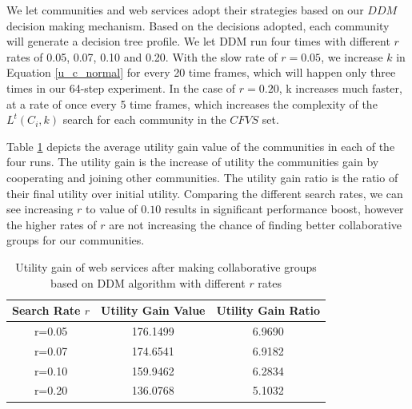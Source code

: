 \documentclass[10pt,journal,cspaper,compsoc]{IEEEtran}
\begin{document}
We let communities and web services adopt their strategies based on our $DDM$ decision making mechanism. Based on the decisions adopted, each community will generate a decision tree profile. We let DDM run four times with different $r$ rates of 0.05, 0.07, 0.10 and 0.20. With the slow rate of $r = 0.05$, we increase $k$ in Equation \ref{u_c_normal} for every 20 time frames, which will happen only three times in our 64-step experiment. In the case of $r = 0.20$, k increases much faster, at a rate of once every 5 time frames, which increases the complexity of the $L^t(C_i,k)$ search for each community in the $CFVS$ set. 

Table \ref{table:valueandgain} depicts the average utility gain value of the communities in each of the four runs. The utility gain is the increase of utility the communities gain by cooperating and joining other communities. The utility gain ratio is the ratio of their final utility over initial utility. Comparing the different search rates, we can see increasing $r$ to value of $0.10$ results in significant performance boost, however the higher rates of $r$ are not increasing the chance of finding better collaborative groups for our communities. 

\begin{table}[ht]
\caption{Utility gain of web services after making collaborative groups based on DDM algorithm with different $r$ rates} %
\centering %
{\renewcommand{\arraystretch}{1.2}
\begin{tabular}{c|c|c} %
\hline\hline %
Search Rate $r$ & Utility Gain Value & Utility Gain Ratio \\ [0.5ex] %
\hline %
r=0.05 & 176.1499 & 6.9690 \\
r=0.07 & 174.6541 & 6.9182 \\
r=0.10 & 159.9462 & 6.2834 \\
r=0.20 & 136.0768 & 5.1032 \\ [1ex] %
\hline %
\end{tabular}
}
\label{table:valueandgain} %
\end{table}


%
\end{document}
